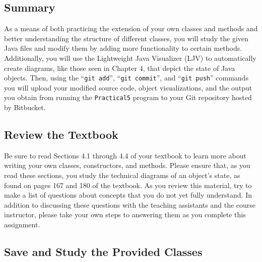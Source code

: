 



\vspace*{-.2in}
\subsection*{Summary}
\vspace*{-.05in}

As a means of both practicing the extension of your own classes and methods and better understanding the structure of
different classes, you will study the given Java files and modify them by adding more functionality to certain 
methods.  Additionally, you will use the Lightweight Java Visualizer (LJV) to automatically create diagrams, like those
seen in Chapter 4, that depict the state of Java objects.  Then, using the ``{\tt git add}'', ``{\tt git commit}'', and
``{\tt git push}'' commands you will upload your modified source code, object visualizations, and the output you obtain
from running the {\tt Practical5} program to your Git repository hosted by Bitbucket.  

\vspace*{-.15in}
\subsection*{Review the Textbook}
\vspace*{-.05in}

Be sure to read Sections 4.1 through 4.4 of your textbook to learn more about writing your own classes, constructors, and
methods.  Please ensure that, as you read these sections, you study the technical diagrams of an object's state, as
found on pages 167 and 180 of the textbook. As you review this material, try to make a list of questions about concepts
that you do not yet fully understand.  In addition to discussing these questions with the teaching assistants and the
course instructor, please take your own steps to answering them as you complete this assignment.

\vspace*{-.15in}
\subsection*{Save and Study the Provided Classes}
\vspace*{-.05in}


